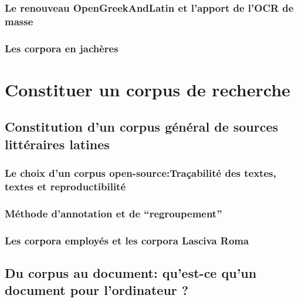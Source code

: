 
\subsubsection{Le renouveau OpenGreekAndLatin et l’apport de l’OCR de masse}

\subsubsection{Les corpora en jachères}


\section{Constituer un corpus de recherche}

\subsection{Constitution d’un corpus général de sources littéraires latines}

\subsubsection{Le choix d’un corpus open-source:Traçabilité des textes, textes et reproductibilité}


\subsubsection{Méthode d’annotation et de “regroupement”}


\subsubsection{Les corpora employés et les corpora Lasciva Roma}


\subsection{Du corpus au document: qu’est-ce qu’un document pour l’ordinateur ?}

